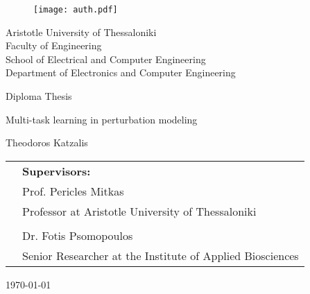 \begin{titlepage}
    \begin{figure}[H]
      \begin{center}
        \texttt{[image: auth.pdf]}
        \label{fig:cover_auth_logo}
      \end{center}
    \end{figure}
    
    \centering
    \Large Aristotle University of Thessaloniki\\
    \Large Faculty of Engineering\\
    \large School of Electrical and Computer Engineering\\
    \large Department of Electronics and Computer Engineering

    
    \vspace{\fill}


    \Large Diploma Thesis

    \vspace{\fill}
    
    \LARGE Multi-task learning in perturbation modeling
    
    \vspace{\fill}
    
    \Large Theodoros Katzalis
    
    \vspace{\fill}
    \raggedright
    
    \begin{tabular}{ll}
    & \textbf{Supervisors:} \\
    & Prof. Pericles Mitkas\\
    & Professor at Aristotle University of Thessaloniki \\
    & \\

    & Dr. Fotis Psomopoulos \\
    & Senior Researcher at the Institute of Applied Biosciences \\

    \end{tabular}
    
    \centering
    \vspace{\fill}
    \today
    
    \end{titlepage}
    
    
    
    
    
    
    
    
    \clearpage
    